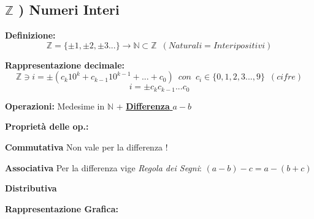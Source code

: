 \documentclass[10pt, oneside]{book}
\theoremstyle{plain}
\begin{document}
\subsection*{$\mathbb{Z}$ ) Numeri Interi}
        \begin{description}
            \item \textbf{Definizione: } \[\mathbb{Z} = \{\pm 1,\pm 2,\pm 3...\} \longrightarrow \mathbb{N} \subset \mathbb{Z} \enspace {(Naturali = Interi positivi)}\]
            \item \textbf{Rappresentazione decimale: }  \[\mathbb{Z} \owns i = \pm (c_k 10^k + c_{k-1} 10^{k-1} + ... + c_0) \enspace{} {con} \enspace{} c_i \in \{0,1,2,3...,9\}\enspace{} {(cifre)}\]
            \[i = \pm c_k c_{k-1} ... c_0\]
            \item \textbf{Operazioni: } Medesime in $\mathbb{N}$ + \underline{\textbf{Differenza} $a-b$}
            \item \textbf{Proprietà delle op.:}
                \begin{description}
                    \item \textbf{Commutativa} {Non vale per la differenza !}
                    \item \textbf{Associativa} {Per la differenza vige \textit{Regola dei Segni}: } $(a-b) - c = a - (b + c)$
                    \item \textbf{Distributiva} 
                \end{description}
            \item \textbf{Rappresentazione Grafica: }
            \item
            \item {}
\end{description}
\end{document}
